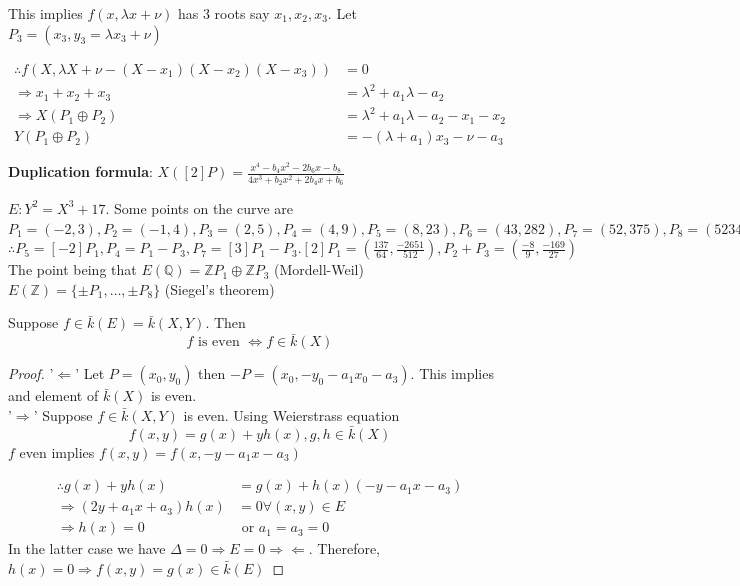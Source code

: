 \documentclass[oneside, 12pt]{scrbook}
\newcommand{\QQ}{\mathbb Q}
\newcommand{\ZZ}{\mathbb Z}
\newcommand{\ds}{\displaystyle}
\theoremstyle{theorem}
\begin{document}
This implies $f(x, \lambda x + \nu)$ has $3$ roots say $x_{1},x_{2},x_{3}$. Let $P_{3}=(x_{3}, y_{3} = \lambda x_{3} + \nu)$

\begin{align*}
\therefore f(X,\lambda X + \nu -(X-x_{1})(X-x_{2})(X-x_{3}) ) &= 0\\
\Rightarrow x_{1} + x_{2} + x_{3} &= \lambda^2 + a_{1}\lambda - a_{2} \\
\Rightarrow X(P_{1}\oplus P_{2}) &= \lambda^2 + a_{1}\lambda - a_{2} - x_{1} - x_{2} \\
Y(P_{1} \oplus P_{2}) &= -(\lambda + a_{1})x_{3} - \nu -a_{3}
\end{align*}

\textbf{Duplication formula}: $X([2]P) = \ds{\frac{x^4 -b_{4}x^2 -2b_{6}x - b_{8}}{4x^3 + b_{2}x^2 + 2b_{4}x + b_{6}}}$

\begin{example}
$E: Y^2 = X^3 + 17$. Some points on the curve are $P_{1} = (-2,3), P_{2} = (-1,4), P_{3} = (2,5), P_{4} = (4,9) , P_{5}=(8,23), P_{6}= (43, 282), P_{7} = (52, 375), P_{8} = (5234, 378661)$ \\
$\therefore P_{5} = [-2]P_{1}, P_{4} = P_{1}-P_{3} , P_{7} = [3]P_{1} - P_{3}. [2]P_{1} = \left( \frac{137}{64}, \frac{-2651}{512} \right) , P_{2} + P_{3} = \left(\frac{-8}{9}, \frac{-169}{27} \right)$ \\

The point being that $E(\QQ) = \ZZ P_{1} \oplus \ZZ P_{3}$ (Mordell-Weil) \\
$E(\ZZ) = \{\pm P_{1}, \hdots , \pm P_{8}\}$ (Siegel's theorem)
\end{example}

\begin{corollary}
Suppose $f\in \bar{k}(E) = \bar{k}(X,Y)$. Then $$f \text{ is even } \Leftrightarrow f \in \bar{k}(X)$$
\end{corollary}

\begin{proof}
'$\Leftarrow$' Let $P=(x_{0},y_{0})$ then $-P=(x_{0}, -y_{0} - a_{1}x_{0} - a_{3})$. This implies and element of $\bar{k}(X)$ is even. \\

'$\Rightarrow$' Suppose $f \in \bar{k}(X,Y)$ is even. Using Weierstrass equation $$f(x,y) = g(x) + yh(x), g,h \in \bar{k}(X)$$
$f$ even implies $f(x,y) = f(x, -y - a_{1}x - a_{3})$

\begin{align*}
\therefore g(x) + yh(x) &= g(x) + h(x)(-y - a_{1}x - a_{3}) \\
\Rightarrow (2y + a_{1}x + a_{3})h(x) &= 0 \forall (x,y) \in E \\
\Rightarrow h(x) = 0 &\text{ or } a_{1}=a_{3}=0
\end{align*}
In the latter case we have $\Delta = 0 \Rightarrow E = 0 \Rightarrow \Leftarrow$. Therefore, $h(x)=0 \Rightarrow f(x,y) = g(x) \in \bar{k}(E)$
\end{proof}
\end{document}
